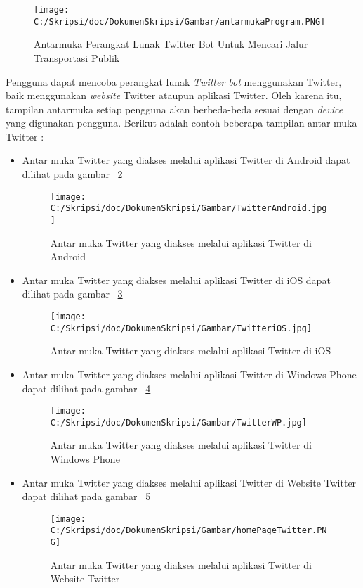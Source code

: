\begin{figure}
	\centering
		\texttt{[image: C:/Skripsi/doc/DokumenSkripsi/Gambar/antarmukaProgram.PNG]}
	\caption{Antarmuka Perangkat Lunak Twitter Bot Untuk Mencari Jalur Transportasi Publik}
	\label{fig:antarmukaProgram}
\end{figure}

Pengguna dapat mencoba perangkat lunak \textit{Twitter bot} menggunakan Twitter, baik menggunakan \textit{website} Twitter ataupun aplikasi Twitter. Oleh karena itu, tampilan antarmuka setiap pengguna akan berbeda-beda sesuai dengan \textit{device} yang digunakan pengguna. Berikut adalah contoh beberapa tampilan antar muka Twitter :

\begin{itemize}
	\item Antar muka Twitter yang diakses melalui aplikasi Twitter di Android dapat dilihat pada gambar ~\ref{fig:TwitterAndroid}
			
			\begin{figure}[htbp]
				\centering
					\texttt{[image: C:/Skripsi/doc/DokumenSkripsi/Gambar/TwitterAndroid.jpg]}
				\caption{Antar muka Twitter yang diakses melalui aplikasi Twitter di Android}
				\label{fig:TwitterAndroid}
			\end{figure}
			
	\item Antar muka Twitter yang diakses melalui aplikasi Twitter di iOS dapat dilihat pada gambar ~\ref{fig:TwitteriOS}
	
	
	\begin{figure}[htbp]
		\centering
			\texttt{[image: C:/Skripsi/doc/DokumenSkripsi/Gambar/TwitteriOS.jpg]}
		\caption{Antar muka Twitter yang diakses melalui aplikasi Twitter di iOS}
		\label{fig:TwitteriOS}
	\end{figure}
	
	\item Antar muka Twitter yang diakses melalui aplikasi Twitter di Windows Phone dapat dilihat pada gambar ~\ref{fig:TwitterWP}
	
	
	\begin{figure}[htbp]
		\centering
			\texttt{[image: C:/Skripsi/doc/DokumenSkripsi/Gambar/TwitterWP.jpg]}
		\caption{Antar muka Twitter yang diakses melalui aplikasi Twitter di Windows Phone}
		\label{fig:TwitterWP}
	\end{figure}
	
	
	\item Antar muka Twitter yang diakses melalui aplikasi Twitter di Website Twitter dapat dilihat pada gambar ~\ref{fig:homePageTwitter}
	
	
	\begin{figure}[htbp]
		\centering
			\texttt{[image: C:/Skripsi/doc/DokumenSkripsi/Gambar/homePageTwitter.PNG]}
		\caption{Antar muka Twitter yang diakses melalui aplikasi Twitter di Website Twitter}
		\label{fig:homePageTwitter}
	\end{figure}
	
\end{itemize}

